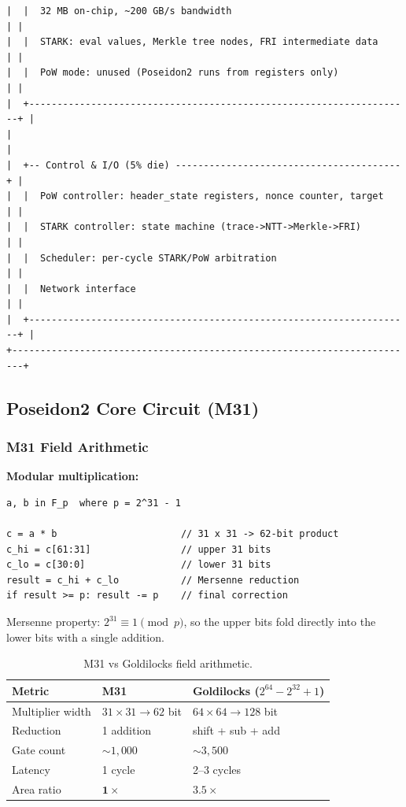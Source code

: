 \documentclass[11pt,a4paper]{article}
\begin{document}
\begin{Verbatim}[fontsize=\scriptsize]
|  |  32 MB on-chip, ~200 GB/s bandwidth                                | |
|  |  STARK: eval values, Merkle tree nodes, FRI intermediate data      | |
|  |  PoW mode: unused (Poseidon2 runs from registers only)             | |
|  +--------------------------------------------------------------------+ |
|                                                                        |
|  +-- Control & I/O (5% die) ----------------------------------------+ |
|  |  PoW controller: header_state registers, nonce counter, target     | |
|  |  STARK controller: state machine (trace->NTT->Merkle->FRI)       | |
|  |  Scheduler: per-cycle STARK/PoW arbitration                        | |
|  |  Network interface                                                  | |
|  +--------------------------------------------------------------------+ |
+------------------------------------------------------------------------+
\end{Verbatim}

\subsection{Poseidon2 Core Circuit (M31)}

\subsubsection{M31 Field Arithmetic}

\textbf{Modular multiplication:}
\begin{Verbatim}[fontsize=\small]
a, b in F_p  where p = 2^31 - 1

c = a * b                      // 31 x 31 -> 62-bit product
c_hi = c[61:31]                // upper 31 bits
c_lo = c[30:0]                 // lower 31 bits
result = c_hi + c_lo           // Mersenne reduction
if result >= p: result -= p    // final correction
\end{Verbatim}

Mersenne property: $2^{31} \equiv 1 \pmod{p}$, so the upper bits fold directly into the lower bits with a single addition.

\begin{table}[h]
\centering
\begin{tabular}{@{}lll@{}}
\toprule
Metric & M31 & Goldilocks ($2^{64} - 2^{32} + 1$) \\
\midrule
Multiplier width & $31 \times 31 \to 62$ bit & $64 \times 64 \to 128$ bit \\
Reduction & 1 addition & shift + sub + add \\
Gate count & ${\sim}1{,}000$ & ${\sim}3{,}500$ \\
Latency & 1 cycle & 2--3 cycles \\
Area ratio & $\mathbf{1\times}$ & $3.5\times$ \\
\bottomrule
\end{tabular}
\caption{M31 vs Goldilocks field arithmetic.}
\label{tab:m31-gold}
\end{table}
\end{document}
